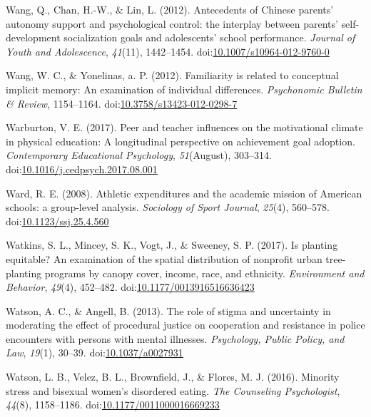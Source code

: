 \documentclass[english,man]{apa6}
\theoremstyle{definition}
\theoremstyle{definition}
\theoremstyle{definition}
\theoremstyle{remark}
\begin{document}
\hypertarget{ref-Wang2012}{}
Wang, Q., Chan, H.-W., \& Lin, L. (2012). Antecedents of Chinese
parents' autonomy support and psychological control: the interplay
between parents' self-development socialization goals and adolescents'
school performance. \emph{Journal of Youth and Adolescence},
\emph{41}(11), 1442--1454.
doi:\href{https://doi.org/10.1007/s10964-012-9760-0}{10.1007/s10964-012-9760-0}

\hypertarget{ref-Wang2012c}{}
Wang, W. C., \& Yonelinas, a. P. (2012). Familiarity is related to
conceptual implicit memory: An examination of individual differences.
\emph{Psychonomic Bulletin \& Review}, 1154--1164.
doi:\href{https://doi.org/10.3758/s13423-012-0298-7}{10.3758/s13423-012-0298-7}

\hypertarget{ref-Warburton2017}{}
Warburton, V. E. (2017). Peer and teacher influences on the motivational
climate in physical education: A longitudinal perspective on achievement
goal adoption. \emph{Contemporary Educational Psychology},
\emph{51}(August), 303--314.
doi:\href{https://doi.org/10.1016/j.cedpsych.2017.08.001}{10.1016/j.cedpsych.2017.08.001}

\hypertarget{ref-Ward2008}{}
Ward, R. E. (2008). Athletic expenditures and the academic mission of
American schools: a group-level analysis. \emph{Sociology of Sport
Journal}, \emph{25}(4), 560--578.
doi:\href{https://doi.org/10.1123/ssj.25.4.560}{10.1123/ssj.25.4.560}

\hypertarget{ref-Watkins2017}{}
Watkins, S. L., Mincey, S. K., Vogt, J., \& Sweeney, S. P. (2017). Is
planting equitable? An examination of the spatial distribution of
nonprofit urban tree-planting programs by canopy cover, income, race,
and ethnicity. \emph{Environment and Behavior}, \emph{49}(4), 452--482.
doi:\href{https://doi.org/10.1177/0013916516636423}{10.1177/0013916516636423}

\hypertarget{ref-Watson2013}{}
Watson, A. C., \& Angell, B. (2013). The role of stigma and uncertainty
in moderating the effect of procedural justice on cooperation and
resistance in police encounters with persons with mental illnesses.
\emph{Psychology, Public Policy, and Law}, \emph{19}(1), 30--39.
doi:\href{https://doi.org/10.1037/a0027931}{10.1037/a0027931}

\hypertarget{ref-Watson2016}{}
Watson, L. B., Velez, B. L., Brownfield, J., \& Flores, M. J. (2016).
Minority stress and bisexual women's disordered eating. \emph{The
Counseling Psychologist}, \emph{44}(8), 1158--1186.
doi:\href{https://doi.org/10.1177/0011000016669233}{10.1177/0011000016669233}
\end{document}
